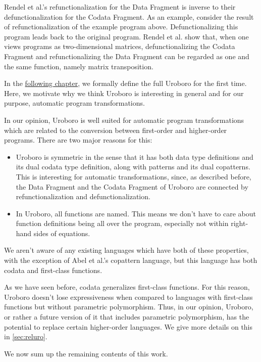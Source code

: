 Rendel et al.'s\cite{rendel15automatic} refunctionalization for the Data Fragment is inverse to their defunctionalization for the Codata Fragment. As an example, consider the result of refunctionalization of the example program above. Defunctionalizing this program leads back to the original program. Rendel et al. show that, when one views programs as two-dimensional matrices, defunctionalizing the Codata Fragment and refunctionalizing the Data Fragment can be regarded as one and the same function, namely matrix transposition.

In the \hyperref[ch:uro]{following chapter}, we formally define the full Uroboro for the first time. Here, we motivate why we think Uroboro is interesting in general and for our purpose, automatic program transformations.

In our opinion, Uroboro is well suited for automatic program transformations which are related to the conversion between first-order and higher-order programs. There are two major reasons for this:
\begin{itemize}
\item Uroboro is symmetric in the sense that it has both data type definitions and its dual codata type definition, along with patterns and its dual copatterns. This is interesting for automatic transformations, since, as described before, the Data Fragment and the Codata Fragment of Uroboro are connected by refunctionalization and defunctionalization.

\item In Uroboro, all functions are named. This means we don't have to care about function definitions being all over the program, especially not within right-hand sides of equations.
\end{itemize}
We aren't aware of any existing languages which have both of these properties, with the exception of Abel et al.'s copattern language\cite{abel13copatterns}, but this language has both codata and first-class functions.

As we have seen before, codata generalizes first-class functions. For this reason, Uroboro doesn't lose expressiveness when compared to languages with first-class functions but without parametric polymorphism. Thus, in our opinion, Uroboro, or rather a future version of it that includes parametric polymorphism, has the potential to replace certain higher-order languages. We give more details on this in \autoref{sec:reluro}.

We now sum up the remaining contents of this work.

